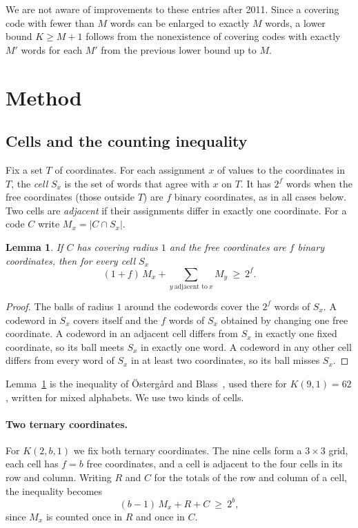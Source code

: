 \documentclass[11pt]{article}
\newtheorem{lemma}[theorem]{Lemma}
\theoremstyle{remark}
\begin{document}
We are not aware of improvements to these entries after 2011. Since a covering code with fewer
than $M$ words can be enlarged to exactly $M$ words, a lower bound $K\ge M+1$ follows from the
nonexistence of covering codes with exactly $M'$ words for each $M'$ from the previous lower bound
up to $M$.

\section{Method}

\subsection{Cells and the counting inequality}

Fix a set $T$ of coordinates. For each assignment $x$ of values to the coordinates in $T$, the
\emph{cell} $S_x$ is the set of words that agree with $x$ on $T$. It has $2^f$ words when the
free coordinates (those outside $T$) are $f$ binary coordinates, as in all cases below. Two cells
are \emph{adjacent} if their assignments differ in exactly one coordinate. For a code $C$ write
$M_x=|C\cap S_x|$.

\begin{lemma}\label{lem:count}
If $C$ has covering radius $1$ and the free coordinates are $f$ binary coordinates, then for every
cell $S_x$
\[
(1+f)\,M_x+\sum_{y\ \text{adjacent to}\ x} M_y\ \ge\ 2^{f}.
\]
\end{lemma}

\begin{proof}
The balls of radius $1$ around the codewords cover the $2^f$ words of $S_x$. A codeword in $S_x$
covers itself and the $f$ words of $S_x$ obtained by changing one free coordinate. A codeword in
an adjacent cell differs from $S_x$ in exactly one fixed coordinate, so its ball meets $S_x$ in
exactly one word. A codeword in any other cell differs from every word of $S_x$ in at least two
coordinates, so its ball misses $S_x$.
\end{proof}

Lemma~\ref{lem:count} is the inequality of Östergård and Blass~\cite{ob}, used there for
$K(9,1)=62$, written for mixed alphabets. We use two kinds of cells.

\paragraph{Two ternary coordinates.} For $K(2,b,1)$ we fix both ternary coordinates. The nine
cells form a $3\times 3$ grid, each cell has $f=b$ free coordinates, and a cell is adjacent to the
four cells in its row and column. Writing $R$ and $C$ for the totals of the row and column of a
cell, the inequality becomes
\begin{equation}\label{eq:grid}
(b-1)\,M_x+R+C\ \ge\ 2^b ,
\end{equation}
since $M_x$ is counted once in $R$ and once in $C$.
\end{document}
